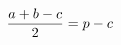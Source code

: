 \documentclass[preview]{standalone}
\begin{document}
\begin{align*}
\special{dvisvgm:raw <g id='unique000'>}\frac{a+b-c}{2}  = p - c\special{dvisvgm:raw </g>}
\end{align*}
\end{document}
